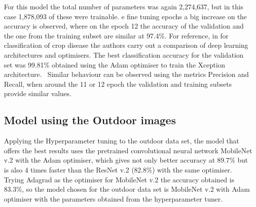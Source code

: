 \documentclass[conference]{IEEEtran}
\begin{document}

For this model the total number of parameters was again 2,274,637, but in this case 1,878,093 of these were trainable. e fine tuning epochs a big increase on the accuracy is observed, where on the epoch 12 the accuracy of the validation and the one from the training subset are similar at 97.4\%. For reference, in\cite{saleem2020plant} for classification of crop disease the authors carry out a comparison of deep learning architectures and optimisers. The best classification accuracy for the validation set was 99.81\% obtained using the Adam optimiser to train the Xception architecture. \
Similar behaviour can be observed using the metrics Precision and Recall, when around the 11 or 12 epoch the validation and training subsets provide similar values. 

\subsection{Model using the Outdoor images}

Applying the Hyperparameter tuning to the outdoor data set, the model that offers the best results uses the pretrained convolutional neural network MobileNet v.2 with the Adam optimiser, which gives not only better accuracy at 89.7\% but is also 4 times faster than the ResNet v.2 (82.8\%) with the same optimiser. Trying Adagrad as the optimiser for MobileNet v.2 the accuracy obtained is 83.3\%, so the model chosen for the outdoor data set is MobileNet v.2 with Adam optimiser with the parameters obtained from the hyperparameter tuner. 
\end{document}
